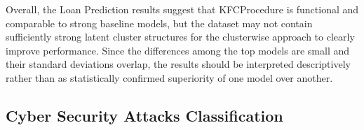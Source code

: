 Overall, the Loan Prediction results suggest that KFCProcedure is functional and comparable to strong baseline models, but the dataset may not contain sufficiently strong latent cluster structures for the clusterwise approach to clearly improve performance. Since the differences among the top models are small and their standard deviations overlap, the results should be interpreted descriptively rather than as statistically confirmed superiority of one model over another.

\subsection{Cyber Security Attacks Classification}

\begin{table}[H]
    \centering
    \caption{Mean Cyber Security Attacks Classification Results}
    \label{tab:cyber_security_aggregated_results}
    \small
\end{table}

